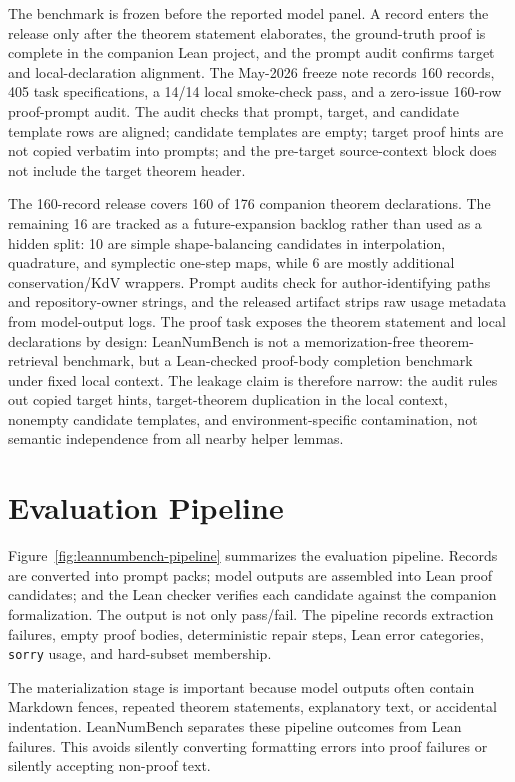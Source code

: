 \documentclass{article}
\begin{document}
The benchmark is frozen before the reported model panel. A record enters the
release only after the theorem statement elaborates, the ground-truth proof is
complete in the companion Lean project, and the prompt audit confirms target
and local-declaration alignment. The May-2026 freeze note records 160 records,
405 task specifications, a 14/14 local smoke-check pass, and a zero-issue
160-row proof-prompt audit. The audit checks that prompt, target, and candidate
template rows are aligned; candidate templates are empty; target proof hints
are not copied verbatim into prompts; and the pre-target source-context block
does not include the target theorem header.

The 160-record release covers 160 of 176 companion theorem declarations. The
remaining 16 are tracked as a future-expansion backlog rather than used as a
hidden split: 10 are simple shape-balancing candidates in interpolation,
quadrature, and symplectic one-step maps, while 6 are mostly additional
conservation/KdV wrappers. Prompt audits check for author-identifying paths
and repository-owner strings, and the released artifact strips raw usage
metadata from model-output logs. The proof task exposes the theorem statement
and local declarations by design: LeanNumBench is not a memorization-free
theorem-retrieval benchmark, but a Lean-checked proof-body completion benchmark
under fixed local context. The leakage claim is therefore narrow: the audit
rules out copied target hints, target-theorem duplication in the local context,
nonempty candidate templates, and environment-specific contamination, not
semantic independence from all nearby helper lemmas.

\section{Evaluation Pipeline}

Figure~\ref{fig:leannumbench-pipeline} summarizes the evaluation pipeline. Records
are converted into prompt packs; model outputs are assembled into Lean proof
candidates; and the Lean checker verifies each candidate against the companion
formalization. The output is not only pass/fail. The pipeline records
extraction failures, empty proof bodies, deterministic repair steps, Lean
error categories, \texttt{sorry} usage, and hard-subset membership.

The materialization stage is important because model outputs often contain
Markdown fences, repeated theorem statements, explanatory text, or accidental
indentation. LeanNumBench separates these pipeline outcomes from Lean failures.
This avoids silently converting formatting errors into proof failures or
silently accepting non-proof text.
\end{document}
